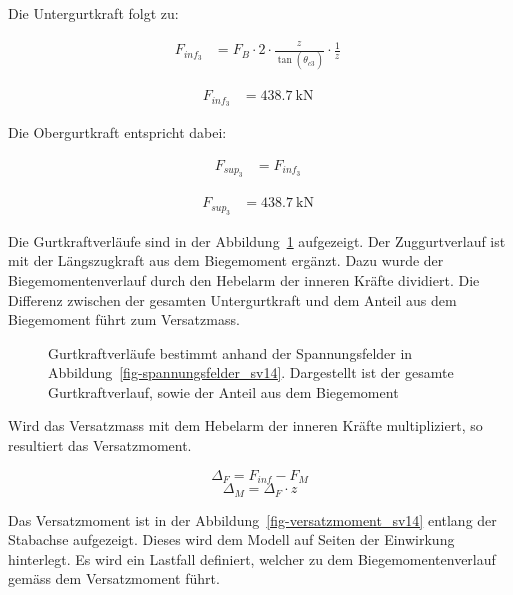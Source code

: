 \documentclass[
  11pt,
  letterpaper,
]{scrreprt}
\begin{document}
Die Untergurtkraft folgt zu:

$$
\begin{aligned}
F_{inf_{3}} &= F_{B} \cdot 2 \cdot \frac{ z_{_{}} }{ \tan \left( \theta_{c3_{_{}}} \right) } \cdot \frac{1} { z_{_{}} } \; 
\end{aligned}
$$

$$
\begin{aligned}
F_{inf_{3}} &= 438.7\ \mathrm{kN} \;
\end{aligned}
$$

Die Obergurtkraft entspricht dabei:

$$
\begin{aligned}
F_{sup_{3}} &= F_{inf_{3}} \; 
\end{aligned}
$$

$$
\begin{aligned}
F_{sup_{3}} &= 438.7\ \mathrm{kN} \;
\end{aligned}
$$

Die Gurtkraftverläufe sind in der Abbildung~\ref{fig-gurtkraft_sv14}
aufgezeigt. Der Zuggurtverlauf ist mit der Längszugkraft aus dem
Biegemoment ergänzt. Dazu wurde der Biegemomentenverlauf durch den
Hebelarm der inneren Kräfte dividiert. Die Differenz zwischen der
gesamten Untergurtkraft und dem Anteil aus dem Biegemoment führt zum
Versatzmass.

\begin{figure}[H]


\caption{\label{fig-gurtkraft_sv14}Gurtkraftverläufe bestimmt anhand der
Spannungsfelder in Abbildung~\ref{fig-spannungsfelder_sv14}. Dargestellt
ist der gesamte Gurtkraftverlauf, sowie der Anteil aus dem Biegemoment}

\end{figure}%

Wird das Versatzmass mit dem Hebelarm der inneren Kräfte multipliziert,
so resultiert das Versatzmoment.

\[
\Delta_F = F_{inf} - F_M
\] \[
\Delta_M = \Delta_F \cdot z
\]

Das Versatzmoment ist in der Abbildung~\ref{fig-versatzmoment_sv14}
entlang der Stabachse aufgezeigt. Dieses wird dem Modell auf Seiten der
Einwirkung hinterlegt. Es wird ein Lastfall definiert, welcher zu dem
Biegemomentenverlauf gemäss dem Versatzmoment führt.
\end{document}
